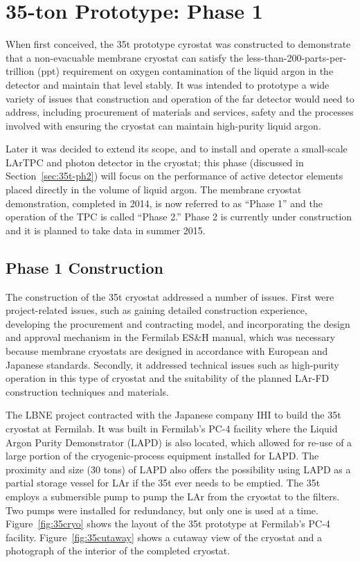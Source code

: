 \section{35-ton Prototype: Phase 1}
\label{35tonprototype}

When first conceived, the 35t prototype cyrostat was constructed to demonstrate that a non-evacuable membrane cryostat can satisfy the less-than-200-parts-per-trillion (ppt) requirement on oxygen contamination of the liquid argon in the detector and maintain that level stably.
%
It was intended to prototype a wide variety of issues that construction and 
operation of the far detector would need to address, including procurement of 
materials and services, safety and the processes involved with ensuring the 
cryostat can maintain high-purity liquid argon. 

Later it was decided to extend its scope, and to install and operate a small-scale LArTPC and photon detector in the cryostat; this phase (discussed in Section~\ref{sec:35t-ph2}) will focus on the performance of active detector elements placed directly in the volume of liquid argon. 
The membrane cryostat demonstration, completed in 2014, is now referred to as ``Phase 1'' and the operation of the TPC is called ``Phase 2.''
Phase 2 is currently under construction and it is planned to take data in summer 2015.


\subsection{Phase 1 Construction}
\label{sec:rnd:35t1:construction}

The construction of the 35t cryostat addressed a number of issues.
First were project-related issues, such as gaining detailed construction experience, 
developing the procurement and contracting model, and incorporating the design and approval mechanism 
in the Fermilab ES\&H manual, which was necessary because membrane cryostats are designed in accordance
with European and Japanese standards.
Secondly, it addressed technical issues such as %
high-purity operation in this type of 
cryostat and the suitability of the planned LAr-FD construction techniques and materials.

The LBNE project contracted with the Japanese company IHI to build the 35t cryostat at Fermilab.  
It was built in Fermilab's PC-4 facility where the Liquid Argon Purity Demonstrator (LAPD)
\cite{bib:lapdP07005}
is also located, which
allowed for re-use of a large portion of the cryogenic-process equipment installed for LAPD.
The proximity and size (30 tons) of LAPD also offers the possibility using LAPD as 
a partial storage vessel for LAr if the 35t ever needs to be emptied. 
The 35t employs a submersible %
pump to pump the LAr from the cryostat to the filters. Two pumps were installed for redundancy, but 
only one is used at a time.
Figure~\ref{fig:35cryo} shows the layout of the 35t prototype at 
Fermilab's PC-4 facility. 
Figure~\ref{fig:35cutaway} shows a cutaway view of the cryostat and a photograph of the interior
of the completed cryostat. 

